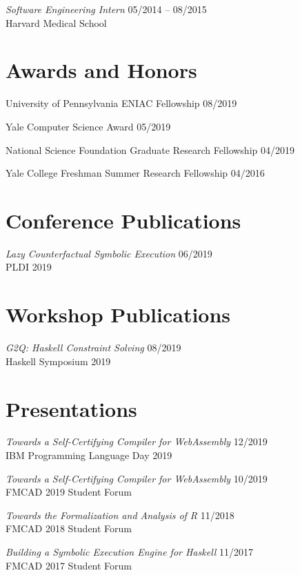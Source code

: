 \documentclass[margin]{res}
\begin{document}
\begin{resume}
\textit{Software Engineering Intern} \hfill 05/2014 -- 08/2015 \\
Harvard Medical School


\section{Awards and Honors}
University of Pennsylvania ENIAC Fellowship \hfill 08/2019

Yale Computer Science Award \hfill 05/2019

National Science Foundation Graduate Research Fellowship \hfill 04/2019

Yale College Freshman Summer Research Fellowship \hfill 04/2016


\section{Conference Publications}
\textit{Lazy Counterfactual Symbolic Execution} \hfill 06/2019 \\
PLDI 2019

\section{Workshop Publications}

\textit{G2Q: Haskell Constraint Solving} \hfill 08/2019 \\
Haskell Symposium 2019


\section{Presentations}
\textit{Towards a Self-Certifying Compiler for WebAssembly} \hfill 12/2019 \\
  IBM Programming Language Day 2019

\textit{Towards a Self-Certifying Compiler for WebAssembly} \hfill 10/2019 \\
  FMCAD 2019 Student Forum

\textit{Towards the Formalization and Analysis of R} \hfill 11/2018 \\
  FMCAD 2018 Student Forum

\textit{Building a Symbolic Execution Engine for Haskell} \hfill 11/2017 \\
  FMCAD 2017 Student Forum


\end{resume}
\end{document}

